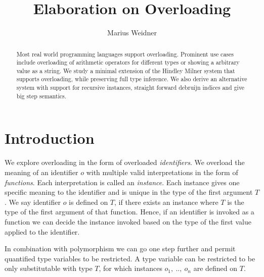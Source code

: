 \documentclass[runningheads]{llncs}
\begin{document}
\title{Elaboration on Overloading}
\author{Marius Weidner}
\maketitle

\begin{abstract}
Most real world programming languages support overloading. 
Prominent use cases include overloading of arithmetic operators for different types or showing a arbitrary value as a string. 
We study a minimal extension of the Hindley Milner system that supports overloading, while preserving full type inference. 
We also derive an alternative system with support for recursive instances, straight forward debruijn indices and give big step semantics.
\end{abstract}

\section{Introduction}
We explore overloading in the form of overloaded \emph{identifiers}.
We overload the meaning of an identifier $o$ with multiple valid interpretations in the form of \emph{functions}. 
Each interpretation is called an \emph{instance}.
Each instance gives one specific meaning to the identifier and is unique in the type of the first argument $T$. 
We say identifier $o$ is defined on $T$, if there exists an instance where $T$ is the type of the first argument of that function.
Hence, if an identifier is invoked as a function we can decide the instance invoked based on the type of the first value applied to the identifier. 

In combination with polymorphism we can go one step further and permit quantified type variables to be restricted. 
A type variable can be restricted to be only substitutable with type $T$, for which instances $o_1, \ .., \ o_n$ are defined on $T$. 
\end{document}
